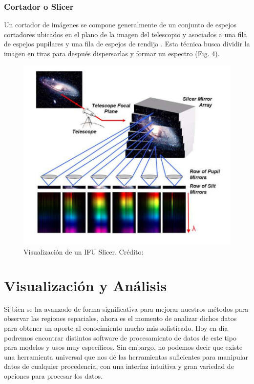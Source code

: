 \documentclass[9pt,twocolumn,a4paper]{opticajnl}
\begin{document}
\subsubsection*{Cortador o Slicer}
Un cortador de imágenes se compone generalmente de un conjunto de espejos cortadores ubicados en el plano de la imagen del telescopio y asociados a una fila de espejos pupilares y una fila de espejos de rendija \cite{vives2005original}. Esta técnica busca dividir la imagen en tiras para después dispersarlas y formar un espectro (Fig. 4).
\begin{figure}
    \centering
    \includegraphics[width=1\linewidth]{slicerimg1.png}
    \caption{Visualización de un IFU Slicer. Crédito: \cite{vives2005original}}
    \label{fig:slicerimg1}
\end{figure}


\section*{Visualización y Análisis}
Si bien se ha avanzado de forma significativa para mejorar nuestros métodos para observar las regiones espaciales, ahora es el momento de analizar dichos datos para obtener un aporte al conocimiento mucho más sofisticado. 
Hoy en día podremos encontrar distintos software de procesamiento de datos de este tipo para modelos y usos muy específicos. Sin embargo, no podemos decir que existe una herramienta universal que nos dé las herramientas suficientes para manipular datos de cualquier procedencia, con una interfaz intuitiva y gran variedad de opciones para procesar los datos.
\end{document}
